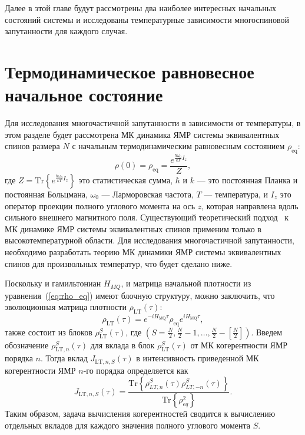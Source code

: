Далее в этой главе будут рассмотрены два наиболее интересных начальных состояний системы
и исследованы температурные зависимости многоспиновой запутанности для каждого случая.

\section{Термодинамическое равновесное начальное состояние}
\label{sec:nanopora-thermodynamic-equilibrium}

Для исследования многочастичной запутанности в зависимости от температуры,
в этом разделе будет рассмотрена МК динамика ЯМР
системы эквивалентных спинов размера $N$
с начальным термодинамическим равновесным состоянием $\rho_\mathrm{eq}$:
%
\begin{equation}\label{eq:rho_eq}
  \rho(0) = \rho_{\mathrm{eq}} = \dfrac{e^{\frac{\hbar\omega_{0}}{kT} I_z}}{Z},
\end{equation}
%
где $Z =\mathrm{Tr}\left\{e^{\frac{\hbar\omega_{0}}{kT} I_z}\right\}$ это статистическая сумма,
$\hbar$ и $k$ --- это постоянная Планка и постоянная Больцмана,
$\omega_0$ --- Ларморовская частота,
$T$ --- температура,
и $I_z$ это оператор проекции полного углового момента на ось $z$,
которая направлена вдоль сильного внешнего магнитного поля.
%
Существующий теоретический подход~\cite{Doronin2009, Doronin2011}
к МК динамике ЯМР системы эквивалентных спинов
применим только в высокотемпературной области.
Для исследования многочастичной запутанности,
необходимо разработать теорию МК динамики ЯМР системы эквивалентных спинов
для произвольных температур,
что будет сделано ниже.

Поскольку и гамильтониан $H_{MQ}$, и матрица начальной плотности из уравнения~(\ref{eq:rho_eq}) имеют блочную структуру,
можно заключить,
что эволюционная матрица плотности $\rho_\mathrm{LT}(\tau)$:
%
\begin{equation}
  \label{eq:rho_eval_lt}
  \rho_\mathrm{LT} (\tau) = e^{-iH_\mathrm{MQ}\tau} \rho_\mathrm{eq} e^{iH_\mathrm{MQ}\tau},
\end{equation}
%
также состоит из блоков $\rho^S_\mathrm{LT}(\tau)$,
где $(S=\frac N 2, \frac N 2 - 1, \dots, \frac N 2 - \left[\frac N 2\right])$.
Введем обозначение $\rho^S_{\mathrm{LT}, n}(\tau)$ для
вклада в блок $\rho^S_\mathrm{LT}(\tau)$ от МК когерентности ЯМР порядка $n$.
Тогда вклад $J_{\mathrm{LT}, n, S}(\tau)$ в интенсивность приведенной МК когерентности ЯМР $n$-го порядка определяется как
%
\begin{equation}
    \label{eq:coherence_k_s}
    J_{\mathrm{LT}, n, S}(\tau) = \dfrac{\mathrm{Tr}\left\{
        \rho_{LT, n}^S(\tau)\rho_{LT, -n}^S(\tau)
    \right\}}
    {\mathrm{Tr}\left\{\rho^2_{eq}\right\}}.
\end{equation}
%
Таким образом, задача вычисления когерентностей сводится к вычислению отдельных вкладов для каждого значения полного углового момента $S$.

